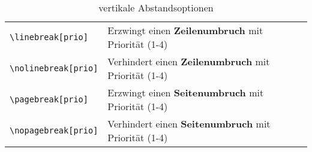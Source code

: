 \begin{table}[H]
\begin{tabular}{lp{10cm}}
        \texttt{\textbackslash linebreak[prio]}   & Erzwingt einen \textbf{Zeilenumbruch} mit Priorität (1-4)             \\
        \texttt{\textbackslash nolinebreak[prio]} & Verhindert einen \textbf{Zeilenumbruch} mit Priorität (1-4)           \\
        \texttt{\textbackslash pagebreak[prio]}   & Erzwingt einen \textbf{Seitenumbruch} mit Priorität (1-4)             \\
        \texttt{\textbackslash nopagebreak[prio]} & Verhindert einen \textbf{Seitenumbruch} mit Priorität (1-4)           \\
        \bottomrule
    \end{tabular}
    \caption{vertikale Abstandsoptionen}
    \label{tab:vertikale_abstaende}
\end{table}